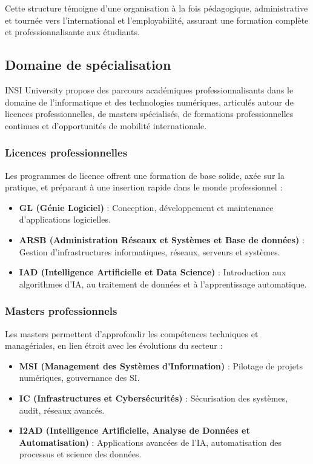\documentclass[a4paper,12pt, oneside]{article}
\begin{document}
Cette structure témoigne d’une organisation à la fois pédagogique, administrative et tournée vers l’international et l’employabilité, assurant une formation complète et professionnalisante aux étudiants.
\subsection{Domaine de spécialisation}

INSI University propose des parcours académiques professionnalisants dans le domaine de l’informatique et des technologies numériques, articulés autour de licences professionnelles, de masters spécialisés, de formations professionnelles continues et d’opportunités de mobilité internationale.

\subsubsection{Licences professionnelles}

Les programmes de licence offrent une formation de base solide, axée sur la pratique, et préparant à une insertion rapide dans le monde professionnel :

\begin{itemize}
    \item \textbf{GL (Génie Logiciel)} : Conception, développement et maintenance d'applications logicielles.
    \item \textbf{ARSB (Administration Réseaux et Systèmes et Base de données)} : Gestion d’infrastructures informatiques, réseaux, serveurs et systèmes.
    \item \textbf{IAD (Intelligence Artificielle et Data Science)} : Introduction aux algorithmes d’IA, au traitement de données et à l’apprentissage automatique.
\end{itemize}

\subsubsection{Masters professionnels}

Les masters permettent d’approfondir les compétences techniques et managériales, en lien étroit avec les évolutions du secteur :

\begin{itemize}
    \item \textbf{MSI (Management des Systèmes d’Information)} : Pilotage de projets numériques, gouvernance des SI.
    \item \textbf{IC (Infrastructures et Cybersécurités)} : Sécurisation des systèmes, audit, réseaux avancés.
    \item \textbf{I2AD (Intelligence Artificielle, Analyse de Données et Automatisation)} : Applications avancées de l’IA, automatisation des processus et science des données.
\end{itemize}
\end{document}
